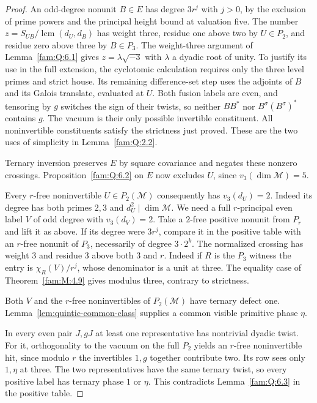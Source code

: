 \documentclass[11pt,a4paper]{article}
\numberwithin{equation}{section}
\theoremstyle{remark}
\newcommand{\lcm}{\operatorname{lcm}}
\begin{document}
\begin{proof}
An odd-degree nonunit $B\in E$ has degree $3r^j$ with $j>0$, by the exclusion of prime powers and the principal height bound at valuation five. The number $z=S_{UB}/\lcm(d_U,d_B)$ has weight three, residue one above two by $U\in P_2$, and residue zero above three by $B\in P_3$. The weight-three argument of Lemma~\ref{fam:Q:6.1} gives $z=\lambda\sqrt{-3}$ with $\lambda$ a dyadic root of unity. To justify its use in the full extension, the cyclotomic calculation requires only the three level primes and strict house. Its remaining difference-set step uses the adjoints of $B$ and its Galois translate, evaluated at $U$. Both fusion labels are even, and tensoring by $g$ switches the sign of their twists, so neither $BB^*$ nor $B^\sigma(B^\sigma)^*$ contains $g$. The vacuum is their only possible invertible constituent. All noninvertible constituents satisfy the strictness just proved. These are the two uses of simplicity in Lemma~\ref{fam:Q:2.2}.

Ternary inversion preserves $E$ by square covariance and negates these
nonzero crossings. Proposition~\ref{fam:Q:6.2} on $E$ now excludes
$U$, since $v_3(\dim\mathcal M)=5$.

Every $r$-free noninvertible $U\in P_2(\mathcal M)$ consequently has $v_3(d_U)=2$. Indeed its degree has both primes $2,3$ and $d_U^2\mid\dim\mathcal M$. We need a full $r$-principal even label $V$ of odd degree with $v_3(d_V)=2$. Take a $2$-free positive nonunit from $P_r$ and lift it as above. If its degree were $3r^j$, compare it in the positive table with an $r$-free nonunit of $P_3$, necessarily of degree $3\cdot2^k$. The normalized crossing has weight $3$ and residue $3$ above both $3$ and $r$. Indeed if $R$ is the $P_3$ witness the entry is $\chi_R(V)/r^j$, whose denominator is a unit at three. The equality case of Theorem~\ref{fam:M:4.9} gives modulus three, contrary to strictness.

Both $V$ and the $r$-free noninvertibles of $P_2(\mathcal M)$ have
ternary defect one. Lemma~\ref{lem:quintic-common-class} supplies
a common visible primitive phase $\eta$.

In every even pair $J,gJ$ at least one representative has nontrivial dyadic twist. For it, orthogonality to the vacuum on the full $P_2$ yields an $r$-free noninvertible hit, since modulo $r$ the invertibles $1,g$ together contribute two. Its row sees only $1,\eta$ at three. The two representatives have the same ternary twist, so every positive label has ternary phase $1$ or $\eta$. This contradicts Lemma~\ref{fam:Q:6.3} in the positive table.
\end{proof}
\end{document}
